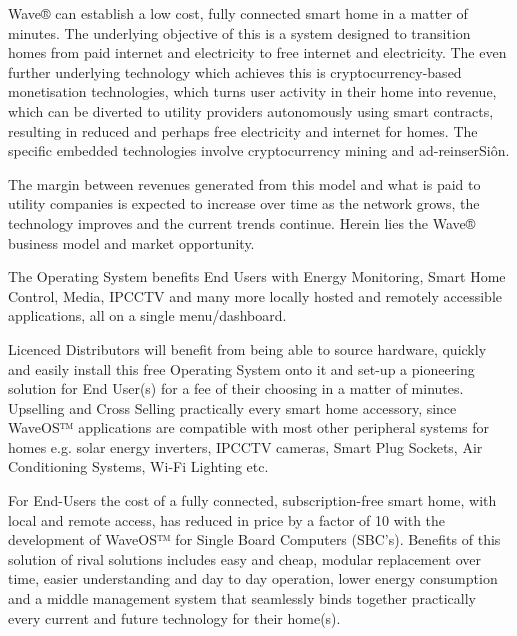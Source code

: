 \documentclass[letterpaper,10pt,english]{sphinxmanual}
\begin{document}
Wave® can establish a low cost, fully connected smart home in a matter of minutes. The underlying objective of this is a system designed to transition homes from paid internet and electricity to free internet and electricity. The even further underlying technology which achieves this is cryptocurrency-based monetisation technologies, which turns user activity in their home into revenue, which can be diverted to utility providers autonomously using smart contracts, resulting in reduced and perhaps free electricity and internet for homes. The specific embedded technologies involve cryptocurrency mining and ad-reinserSiôn.

The margin between revenues generated from this model and what is paid to utility companies is expected to increase over time as the network grows, the technology improves and the current trends continue. Herein lies the Wave® business model and market opportunity.

The Operating System benefits End Users with Energy Monitoring, Smart Home Control, Media, IPCCTV and many more locally hosted and remotely accessible applications, all on a single menu/dashboard.

Licenced Distributors will benefit from being able to source hardware, quickly and easily install this free Operating System onto it and set-up a pioneering solution for End User(s) for a fee of their choosing in a matter of minutes. Upselling and Cross Selling practically every smart home accessory, since WaveOS™ applications are compatible with most other peripheral systems for homes e.g. solar energy inverters, IPCCTV cameras, Smart Plug Sockets, Air Conditioning Systems, Wi-Fi Lighting etc.

For End-Users the cost of a fully connected, subscription-free smart home, with local and remote access, has reduced in price by a factor of 10 with the development of WaveOS™ for Single Board Computers (SBC’s). Benefits of this solution of rival solutions includes easy and cheap, modular replacement over time, easier understanding and day to day operation, lower energy consumption and a middle management system that seamlessly binds together practically every current and future technology for their home(s).


\chapter{}
\label{\detokenize{index:document-author-s}}
\end{document}
